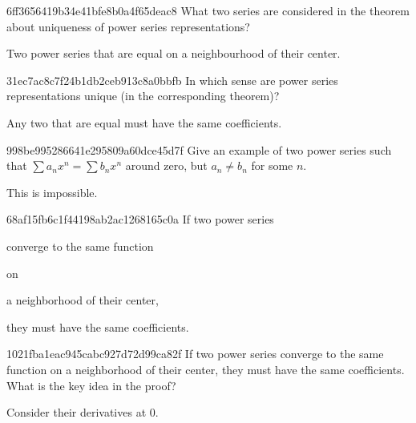 \begin{note}{6ff3656419b34e41bfe8b0a4f65deac8}
    What two series are considered in the theorem about uniqueness of power series representations?

    \begin{cloze}{1}
        Two power series that are equal on a neighbourhood of their center.
    \end{cloze}
\end{note}

\begin{note}{31ec7ac8c7f24b1db2ceb913c8a0bbfb}
    In which sense are power series representations unique (in the corresponding theorem)?

    \begin{cloze}{1}
        Any two that are equal must have the same coefficients.
    \end{cloze}
\end{note}

\begin{note}{998be995286641e295809a60dce45d7f}
    Give an example of two power series such that \({ \sum a_n x^{n} = \sum b_n x^{n} }\) around zero, but \({ a_n \neq b_n }\) for some \({ n }\).

    \begin{cloze}{1}
        This is impossible.
    \end{cloze}
\end{note}

\begin{note}{68af15fb6c1f44198ab2ac1268165c0a}
    If two power series \begin{icloze}{3}converge to the same function\end{icloze} on \begin{icloze}{2}a neighborhood of their center,\end{icloze} \begin{icloze}{1}they must have the same coefficients.\end{icloze}
\end{note}

\begin{note}{1021fba1eac945cabc927d72d99ca82f}
    If two power series converge to the same function on a neighborhood of their center, they must have the same coefficients.
    What is the key idea in the proof?

    \begin{cloze}{1}
        Consider their derivatives at \({ 0 }\).
    \end{cloze}
\end{note}


